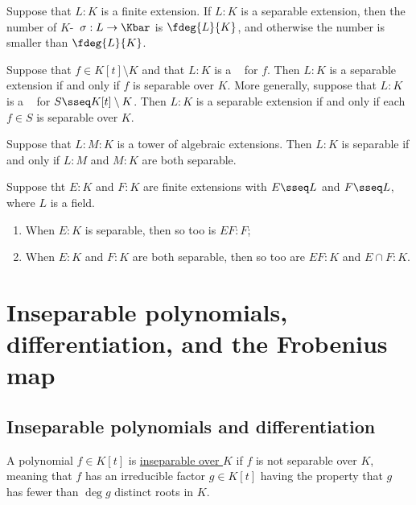 \documentclass{article}
\begin{document}
  \begin{tcorollary}
    Suppose that \( L:K \) is a finite extension.
    If \( L:K \) is a separable extension, then the number of \( K \)-\homo~\( \sigma:L\to\Kbar \) is \( \fdeg{L}{K} \), and otherwise the number is smaller than \( \fdeg{L}{K} \).
  \end{tcorollary}

  \begin{tcorollary}
    Suppose that \( f\in K[t]\setminus K \) and that \( L:K \) is a \sfe~ for \( f \).
    Then \( L:K \) is a separable extension if and only if \( f \) is separable over \( K \).
    More generally, suppose that \( L:K \) is a \sfe~ for \( S\sseq K[t]\setminus K \).
    Then \( L:K \) is a separable extension if and only if each \( f\in S \) is separable over \( K \).
  \end{tcorollary}

  \begin{ttheorem}
    Suppose that \( L:M:K \) is a tower of algebraic extensions.
    Then \( L:K \) is separable if and only if \( L:M \) and \( M:K \) are both separable.
  \end{ttheorem}

  \begin{ttheorem}
    Suppose tht \( E:K \) and \( F:K \) are finite extensions with \( E\sseq L \) and \( F\sseq L \), where \( L \) is a field.
    \begin{enumerate}[label=(\alph*)]
      \item When \( E:K \) is separable, then so too is \( EF:F \);
      \item When \( E:K \) and \( F:K \) are both separable, then so too are \( EF:K \) and \( E\cap F:K \).
    \end{enumerate}
  \end{ttheorem}

\section{Inseparable polynomials, differentiation, and the Frobenius map}
\subsection{Inseparable polynomials and differentiation}
  \begin{tdefinition}[Inseparable]
    A polynomial \( f \in K[t] \) is \ul{inseparable over \( K \)} if \( f \) is not separable over \( K \), meaning that \( f \) has an irreducible factor \( g \in K[t] \) having the property that \( g \) has fewer than \( \deg g \) distinct roots in \( K \).
  \end{tdefinition}
\end{document}
